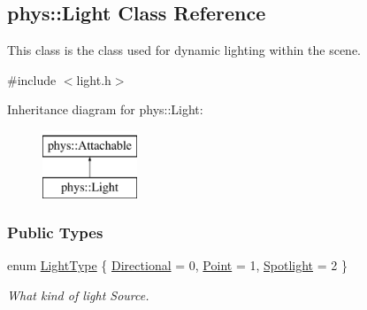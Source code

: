 \hypertarget{classphys_1_1Light}{
\subsection{phys::Light Class Reference}
\label{dc/df1/classphys_1_1Light}
}


This class is the class used for dynamic lighting within the scene.  




{\ttfamily \#include $<$light.h$>$}

Inheritance diagram for phys::Light:\begin{figure}[H]
\begin{center}
\leavevmode
\includegraphics[height=2.000000cm]{dc/df1/classphys_1_1Light}
\end{center}
\end{figure}
\subsubsection*{Public Types}
\begin{DoxyCompactItemize}
\item 
enum \hyperlink{classphys_1_1Light_aef1be63d57f59f33bf4c66be797009bf}{LightType} \{ \hyperlink{classphys_1_1Light_aef1be63d57f59f33bf4c66be797009bfac3ba7607dde18593ca9c727b0baf81e3}{Directional} =  0, 
\hyperlink{classphys_1_1Light_aef1be63d57f59f33bf4c66be797009bfa8030594658d86b56e82ac4e4233eeb63}{Point} =  1, 
\hyperlink{classphys_1_1Light_aef1be63d57f59f33bf4c66be797009bfa8b7e7aa3e44d03789a35c40947e99f3a}{Spotlight} =  2
 \}
\begin{DoxyCompactList}\small\item\em What kind of light Source. \item\end{DoxyCompactList}\end{DoxyCompactItemize}
